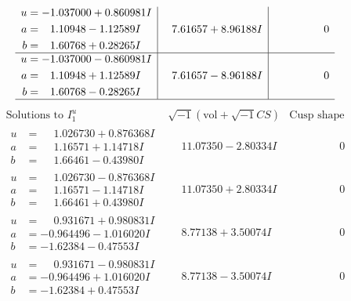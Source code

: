 \documentclass[1p]{elsarticle_modified}
\theoremstyle{definition}
\newcommand{\I}{\sqrt{-1}}
\begin{document}
$$\begin{array}{c|c|c}
\begin{aligned}
u &= -1.037000 + 0.860981 I \\
a &= \phantom{-}1.10948 - 1.12589 I \\
b &= \phantom{-}1.60768 + 0.28265 I\end{aligned}
 & \phantom{-}7.61657 + 8.96188 I & \phantom{-0.000000 } 0 \\ \hline\begin{aligned}
u &= -1.037000 - 0.860981 I \\
a &= \phantom{-}1.10948 + 1.12589 I \\
b &= \phantom{-}1.60768 - 0.28265 I\end{aligned}
 & \phantom{-}7.61657 - 8.96188 I & \phantom{-0.000000 } 0\\
 \hline 
 \end{array}$$\newpage$$\begin{array}{c|c|c}  
\text{Solutions to }I^u_{1}& \I (\text{vol} + \sqrt{-1}CS) & \text{Cusp shape}\\
 \hline 
\begin{aligned}
u &= \phantom{-}1.026730 + 0.876368 I \\
a &= \phantom{-}1.16571 + 1.14718 I \\
b &= \phantom{-}1.66461 - 0.43980 I\end{aligned}
 & \phantom{-}11.07350 - 2.80334 I & \phantom{-0.000000 } 0 \\ \hline\begin{aligned}
u &= \phantom{-}1.026730 - 0.876368 I \\
a &= \phantom{-}1.16571 - 1.14718 I \\
b &= \phantom{-}1.66461 + 0.43980 I\end{aligned}
 & \phantom{-}11.07350 + 2.80334 I & \phantom{-0.000000 } 0 \\ \hline\begin{aligned}
u &= \phantom{-}0.931671 + 0.980831 I \\
a &= -0.964496 - 1.016020 I \\
b &= -1.62384 - 0.47553 I\end{aligned}
 & \phantom{-}8.77138 + 3.50074 I & \phantom{-0.000000 } 0 \\ \hline\begin{aligned}
u &= \phantom{-}0.931671 - 0.980831 I \\
a &= -0.964496 + 1.016020 I \\
b &= -1.62384 + 0.47553 I\end{aligned}
 & \phantom{-}8.77138 - 3.50074 I & \phantom{-0.000000 } 0 \\ \hline\begin{aligned}

\end{aligned}
\end{array}$$
\end{document}
